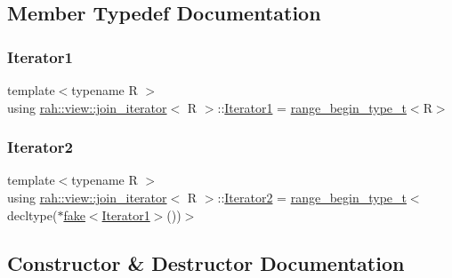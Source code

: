 \subsection{Member Typedef Documentation}
\mbox{\label{structrah_1_1view_1_1join__iterator_a8b71c6f25eee2915e2a8afc6e024196d}} 
\subsubsection{\texorpdfstring{Iterator1}{Iterator1}}
{\footnotesize\ttfamily template$<$typename R $>$ \\
using \mbox{\hyperlink{structrah_1_1view_1_1join__iterator}{rah\+::view\+::join\+\_\+iterator}}$<$ R $>$\+::\mbox{\hyperlink{structrah_1_1view_1_1join__iterator_a8b71c6f25eee2915e2a8afc6e024196d}{Iterator1}} =  \mbox{\hyperlink{namespacerah_a28aff4eeddcece6be65ff0b956d32d4a}{range\+\_\+begin\+\_\+type\+\_\+t}}$<$R$>$}

\mbox{\label{structrah_1_1view_1_1join__iterator_ae03a066174f3422c70d0e3c22e68d9f7}} 
\subsubsection{\texorpdfstring{Iterator2}{Iterator2}}
{\footnotesize\ttfamily template$<$typename R $>$ \\
using \mbox{\hyperlink{structrah_1_1view_1_1join__iterator}{rah\+::view\+::join\+\_\+iterator}}$<$ R $>$\+::\mbox{\hyperlink{structrah_1_1view_1_1join__iterator_ae03a066174f3422c70d0e3c22e68d9f7}{Iterator2}} =  \mbox{\hyperlink{namespacerah_a28aff4eeddcece6be65ff0b956d32d4a}{range\+\_\+begin\+\_\+type\+\_\+t}}$<$decltype($\ast$\mbox{\hyperlink{namespacerah_a11785bbdf970efa1bc57fc14993b77bf}{fake}}$<$\mbox{\hyperlink{structrah_1_1view_1_1join__iterator_a8b71c6f25eee2915e2a8afc6e024196d}{Iterator1}}$>$())$>$}



\subsection{Constructor \& Destructor Documentation}
\mbox{\label{structrah_1_1view_1_1join__iterator_a3413f5a25f3c86b1d85ad9335e6e8e39}} 
